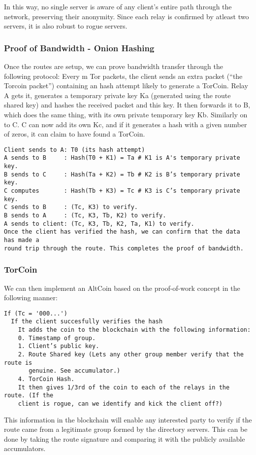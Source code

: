 In this way, no single server is aware of any client's entire path through the network, preserving their anonymity. Since each relay is confirmed by atleast two servers, it is also robust to rogue servers. 

\subsubsection{Proof of Bandwidth - Onion Hashing}
Once the routes are setup, we can prove bandwidth transfer through the following protocol:
Every m Tor packets, the client sends an extra packet (“the Torcoin packet”) containing an hash attempt likely to generate a TorCoin. Relay A gets it, generates a temporary private key Ka (generated using the route shared key) and hashes the received packet and this key. It then forwards it to B, which does the same thing, with its own private temporary key Kb. Similarly on to C. C can now add its own Kc, and if it generates a hash with a given number of zeros, it can claim to have found a TorCoin.
\begin{verbatim}
Client sends to A: T0 (its hash attempt)
A sends to B     : Hash(T0 + K1) = Ta # K1 is A's temporary private key.
B sends to C     : Hash(Ta + K2) = Tb # K2 is B’s temporary private key.
C computes       : Hash(Tb + K3) = Tc # K3 is C’s temporary private key.
C sends to B     : (Tc, K3) to verify.
B sends to A     : (Tc, K3, Tb, K2) to verify.
A sends to client: (Tc, K3, Tb, K2, Ta, K1) to verify.
Once the client has verified the hash, we can confirm that the data has made a 
round trip through the route. This completes the proof of bandwidth.
\end{verbatim}

\subsubsection{TorCoin}
We can then implement an AltCoin based on the proof-of-work concept in the following manner:
\begin{verbatim}
If (Tc = '000...')
  If the client succesfully verifies the hash
    It adds the coin to the blockchain with the following information:
    0. Timestamp of group.
    1. Client’s public key.
    2. Route Shared key (Lets any other group member verify that the route is 
       genuine. See accumulator.)
    4. TorCoin Hash.
    It then gives 1/3rd of the coin to each of the relays in the route. (If the 
    client is rogue, can we identify and kick the client off?)
\end{verbatim}
This information in the blockchain will enable any interested party to verify if the route came from a legitimate group formed by the directory servers. This can be done by taking the route signature and comparing it with the publicly available accumulators. 

